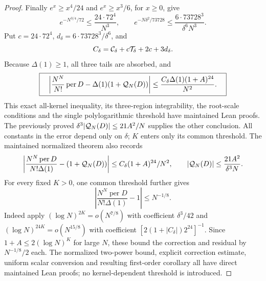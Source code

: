 \begin{proof}
Finally \(e^x\ge x^4/24\) and \(e^x\ge x^3/6\), for \(x\ge0\), give
\[
 e^{-N^{3/4}/72}\le\frac{24\cdot72^4}{N^3},\qquad
 e^{-N\delta^2/73728}
       \le\frac{6\cdot73728^3}{\delta^6N^3}.
\]
Put \(c=24\cdot72^4\), \(d_\delta=6\cdot73728^3/\delta^6\), and
\[
 C_\delta={\cal C}_\delta+c{\cal T}_\delta+2c+3d_\delta .
\]
Because \(\Delta(1)\ge1\), all three tails are absorbed, and
\[
 \boxed{\quad
 \left|\frac{N^N}{N!}\operatorname{per}D
             -\Delta(1)(1+{\cal Q}_N(D))\right|
       \le\frac{C_\delta\Delta(1)(1+A)^{24}}{N^2}.\quad}
\]
This exact all-kernel inequality, its three-region integrability,
the root-scale conditions and the single polylogarithmic threshold
have maintained Lean proofs. The previously proved
\(\delta^3|{\cal Q}_N(D)|\le21A^2/N\) supplies the other conclusion.
All constants in the error depend only on \(\delta\);
\(K\) enters only its common threshold.
The maintained normalized theorem also records
\[
 \left|\frac{N^N\operatorname{per}D}{N!\Delta(1)}
                  -(1+{\cal Q}_N(D))\right|
       \le C_\delta(1+A)^{24}/N^2,\qquad
 |{\cal Q}_N(D)|\le\frac{21A^2}{\delta^3N}.
\]
For every fixed \(K>0\), one common threshold further gives
\[
 \left|\frac{N^N\operatorname{per}D}{N!\Delta(1)}-1\right|
                      \le N^{-1/8}.
\]
Indeed apply \((\log N)^{2K}=o(N^{7/8})\) with coefficient
\(\delta^3/42\) and \((\log N)^{24K}=o(N^{15/8})\) with
coefficient \([2(1+|C_\delta|)2^{24}]^{-1}\).
Since \(1+A\le2(\log N)^K\) for large \(N\), these bound the
correction and residual by \(N^{-1/8}/2\) each.
The normalized two-power bound, explicit correction estimate,
uniform scalar conversion and resulting first-order corollary all
have direct maintained Lean proofs; no kernel-dependent threshold
is introduced.
\end{proof}
